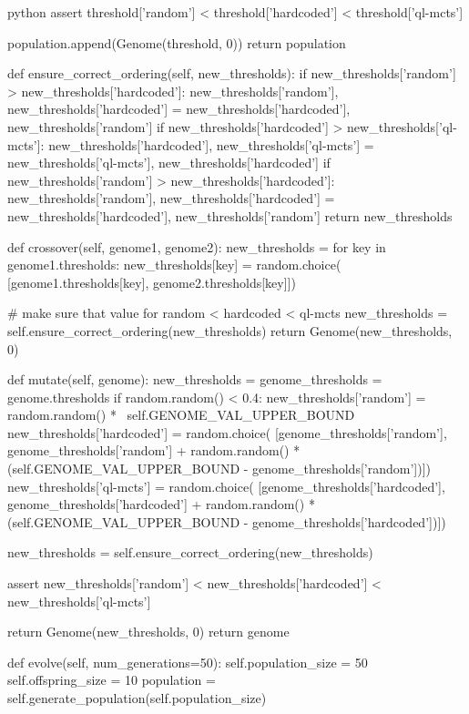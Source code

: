 \begin{mintedbox}{python}
            assert threshold['random'] < threshold['hardcoded'] < threshold['ql-mcts']

            population.append(Genome(threshold, 0))
        return population

    def ensure_correct_ordering(self, new_thresholds):
        if new_thresholds['random'] > new_thresholds['hardcoded']:
            new_thresholds['random'], new_thresholds['hardcoded'] = new_thresholds['hardcoded'], new_thresholds['random']
        if new_thresholds['hardcoded'] > new_thresholds['ql-mcts']:
            new_thresholds['hardcoded'], new_thresholds['ql-mcts'] = new_thresholds['ql-mcts'], new_thresholds['hardcoded']
        if new_thresholds['random'] > new_thresholds['hardcoded']:
            new_thresholds['random'], new_thresholds['hardcoded'] = new_thresholds['hardcoded'], new_thresholds['random']
        return new_thresholds

    def crossover(self, genome1, genome2):
        new_thresholds = {}
        for key in genome1.thresholds:
            new_thresholds[key] = random.choice(
                [genome1.thresholds[key], genome2.thresholds[key]])

        # make sure that value for random < hardcoded < ql-mcts
        new_thresholds = self.ensure_correct_ordering(new_thresholds)
        return Genome(new_thresholds, 0)

    def mutate(self, genome):
        new_thresholds = {}
        genome_thresholds = genome.thresholds
        if random.random() < 0.4:
            new_thresholds['random'] = random.random() * \
                self.GENOME_VAL_UPPER_BOUND
            new_thresholds['hardcoded'] = random.choice(
                [genome_thresholds['random'], genome_thresholds['random'] +
                    random.random() * (self.GENOME_VAL_UPPER_BOUND - genome_thresholds['random'])])
            new_thresholds['ql-mcts'] = random.choice(
                [genome_thresholds['hardcoded'], genome_thresholds['hardcoded'] +
                    random.random() * (self.GENOME_VAL_UPPER_BOUND - genome_thresholds['hardcoded'])])

            new_thresholds = self.ensure_correct_ordering(new_thresholds)

            assert new_thresholds['random'] < new_thresholds['hardcoded'] < new_thresholds['ql-mcts']

            return Genome(new_thresholds, 0)
        return genome

    def evolve(self, num_generations=50):
        self.population_size = 50
        self.offspring_size = 10
        population = self.generate_population(self.population_size)


\end{mintedbox}

